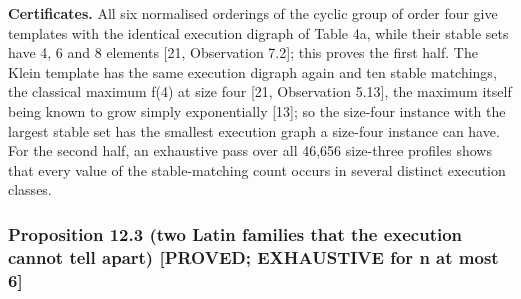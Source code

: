 \documentclass[
  11pt,
]{article}
\begin{document}
\textbf{Certificates.} All six normalised orderings of the cyclic group
of order four give templates with the identical execution digraph of
Table 4a, while their stable sets have 4, 6 and 8 elements {[}21,
Observation 7.2{]}; this proves the first half. The Klein template has
the same execution digraph again and ten stable matchings, the classical
maximum f(4) at size four {[}21, Observation 5.13{]}, the maximum itself
being known to grow simply exponentially {[}13{]}; so the size-four
instance with the largest stable set has the smallest execution graph a
size-four instance can have. For the second half, an exhaustive pass
over all 46,656 size-three profiles shows that every value of the
stable-matching count occurs in several distinct execution classes.

\hypertarget{proposition-12.3-two-latin-families-that-the-execution-cannot-tell-apart-proved-exhaustive-for-n-at-most-6}{%
\subsubsection{Proposition 12.3 (two Latin families that the execution
cannot tell apart) {[}PROVED; EXHAUSTIVE for n at most
6{]}}\label{proposition-12.3-two-latin-families-that-the-execution-cannot-tell-apart-proved-exhaustive-for-n-at-most-6}}
\end{document}

